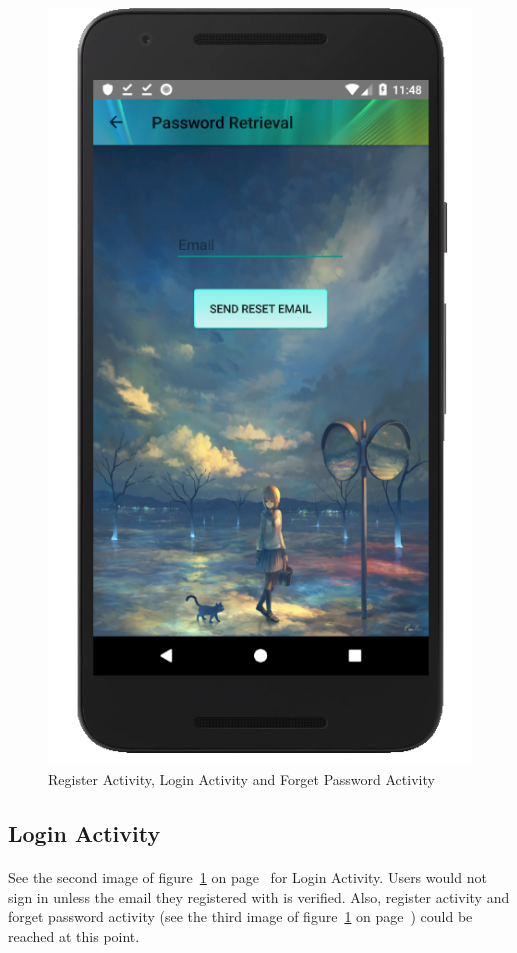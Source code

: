 \documentclass[12pt]{article}
\begin{document}
\begin{figure}
	\includegraphics[scale=0.25]{ForgetPassword.png}
	\caption{\label{fig:registerLoginFp}Register Activity, Login Activity and Forget Password Activity}
\end{figure}

\subsection{Login Activity}
\paragraph{}
See the second image of figure~\ref{fig:registerLoginFp} on page~\pageref{fig:registerLoginFp} for Login Activity. Users would not sign in unless the email they registered with is verified. Also, register activity and forget password activity (see the third image of figure~\ref{fig:registerLoginFp} on page~\pageref{fig:registerLoginFp}) could be reached at this point.
\end{document}
